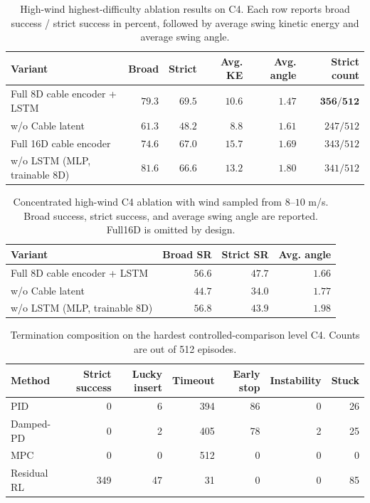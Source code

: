 \documentclass[10pt]{article}
\begin{document}
\begin{table}[t]
\centering
\caption{High-wind highest-difficulty ablation results on C4.  Each row reports broad success / strict success in percent, followed by average swing kinetic energy and average swing angle.}
\label{tab:formal_interval_ablation}
\footnotesize
\setlength{\tabcolsep}{4pt}
\begin{tabularx}{\linewidth}{@{}Yrrrrr@{}}
\toprule
Variant & Broad & Strict & Avg. KE & Avg. angle & Strict count \\
\midrule
Full 8D cable encoder + LSTM
  & $79.3$ & $\mathbf{69.5}$ & $10.6$ & $\mathbf{1.47}$ & $\mathbf{356/512}$ \\
w/o Cable latent
  & $61.3$ & $48.2$ & $8.8$ & $1.61$ & $247/512$ \\
Full 16D cable encoder
  & $74.6$ & $67.0$ & $15.7$ & $1.69$ & $343/512$ \\
w/o LSTM (MLP, trainable 8D)
  & $\mathbf{81.6}$ & $66.6$ & $13.2$ & $1.80$ & $341/512$ \\
\bottomrule
\end{tabularx}
\end{table}

\begin{table}[t]
\centering
\caption{Concentrated high-wind C4 ablation with wind sampled from $8$--$10$ m/s.  Broad success, strict success, and average swing angle are reported.  Full16D is omitted by design.}
\label{tab:formal_interval_ablation_wind8to10}
\footnotesize
\setlength{\tabcolsep}{4pt}
\begin{tabularx}{0.82\linewidth}{@{}Yrrr@{}}
\toprule
Variant & Broad SR & Strict SR & Avg. angle \\
\midrule
Full 8D cable encoder + LSTM
  & $56.6$ & $\mathbf{47.7}$ & $\mathbf{1.66}$ \\
w/o Cable latent
  & $44.7$ & $34.0$ & $1.77$ \\
w/o LSTM (MLP, trainable 8D)
  & $\mathbf{56.8}$ & $43.9$ & $1.98$ \\
\bottomrule
\end{tabularx}
\end{table}

\begin{table}[t]
\centering
\caption{Termination composition on the hardest controlled-comparison level C4.  Counts are out of 512 episodes.}
\label{tab:formal_interval_c4_terminations}
\footnotesize
\setlength{\tabcolsep}{5pt}
\begin{tabular}{lrrrrrr}
\toprule
Method & Strict success & Lucky insert & Timeout & Early stop & Instability & Stuck \\
\midrule
PID & 0 & 6 & 394 & 86 & 0 & 26 \\
Damped-PD & 0 & 2 & 405 & 78 & 2 & 25 \\
MPC & 0 & 0 & 512 & 0 & 0 & 0 \\
Residual RL & 349 & 47 & 31 & 0 & 0 & 85 \\
\bottomrule
\end{tabular}
\end{table}
\end{document}
